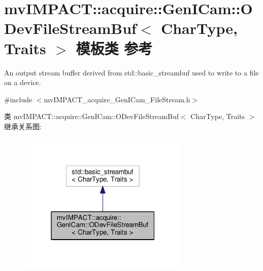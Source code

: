 \hypertarget{classmv_i_m_p_a_c_t_1_1acquire_1_1_gen_i_cam_1_1_o_dev_file_stream_buf}{\section{mv\+I\+M\+P\+A\+C\+T\+:\+:acquire\+:\+:Gen\+I\+Cam\+:\+:O\+Dev\+File\+Stream\+Buf$<$ Char\+Type, Traits $>$ 模板类 参考}
\label{classmv_i_m_p_a_c_t_1_1acquire_1_1_gen_i_cam_1_1_o_dev_file_stream_buf}
}


An output stream buffer derived from std\+::basic\+\_\+streambuf used to write to a file on a device.  




{\ttfamily \#include $<$mv\+I\+M\+P\+A\+C\+T\+\_\+acquire\+\_\+\+Gen\+I\+Cam\+\_\+\+File\+Stream.\+h$>$}



类 mv\+I\+M\+P\+A\+C\+T\+:\+:acquire\+:\+:Gen\+I\+Cam\+:\+:O\+Dev\+File\+Stream\+Buf$<$ Char\+Type, Traits $>$ 继承关系图\+:
\nopagebreak
\begin{figure}[H]
\begin{center}
\leavevmode
\includegraphics[width=232pt]{classmv_i_m_p_a_c_t_1_1acquire_1_1_gen_i_cam_1_1_o_dev_file_stream_buf__inherit__graph}
\end{center}
\end{figure}


